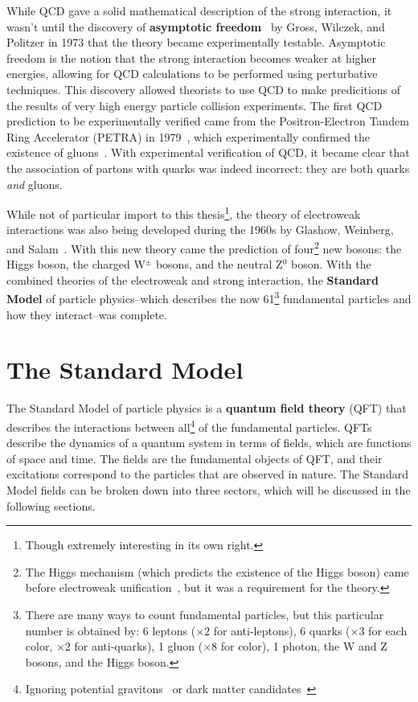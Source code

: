 While QCD gave a solid mathematical description of the strong interaction, it wasn't until the discovery of \textbf{asymptotic freedom}~\cite{AssFreedom1, AssFreedom2} by Gross, Wilczek, and Politzer in 1973 that the theory became experimentally testable. Asymptotic freedom is the notion that the strong interaction becomes weaker at higher energies, allowing for QCD calculations to be performed using perturbative techniques. This discovery allowed theorists to use QCD to make predicitions of the results of very high energy particle collision experiments. The first QCD prediction to be experimentally verified came from the Positron-Electron Tandem Ring Accelerator (PETRA) in 1979~\cite{PETRA}, which experimentally confirmed the existence of gluons~\cite{GluonConfirmation}. With experimental verification of QCD, it became clear that the association of partons with quarks was indeed incorrect: they are both quarks \textit{and} gluons.

While not of particular import to this thesis\footnote{Though extremely interesting in its own right.}, the theory of electroweak interactions was also being developed during the 1960s by Glashow, Weinberg, and Salam~\cite{Electroweak1, Electroweak2}. With this new theory came the prediction of four\footnote{The Higgs mechanism (which predicts the existence of the Higgs boson) came before electroweak unification~\cite{HiggsPaper}, but it was a requirement for the theory.} new bosons: the Higgs boson, the charged W$^{\pm}$ bosons, and the neutral Z$^{0}$ boson. With the combined theories of the electroweak and strong interaction, the \textbf{Standard Model} of particle physics--which describes the now 61\footnote{There are many ways to count fundamental particles, but this particular number is obtained by: 6 leptons ($\times 2$ for anti-leptons), 6 quarks ($\times 3$ for each color, $\times 2$ for anti-quarks), 1 gluon ($\times 8$ for color), 1 photon, the W and Z bosons, and the Higgs boson.} fundamental particles and how they interact--was complete. 


\section{The Standard Model}
\label{sec:standard_model}

The Standard Model of particle physics is a \textbf{quantum field theory} (QFT) that describes the interactions between all\footnote{Ignoring potential gravitons~\cite{Graviton} or dark matter candidates~\cite{DarkMatter1}} of the fundamental particles. QFTs describe the dynamics of a quantum system in terms of fields, which are functions of space and time. The fields are the fundamental objects of QFT, and their excitations correspond to the particles that are observed in nature. The Standard Model fields can be broken down into three sectors, which will be discussed in the following sections.

